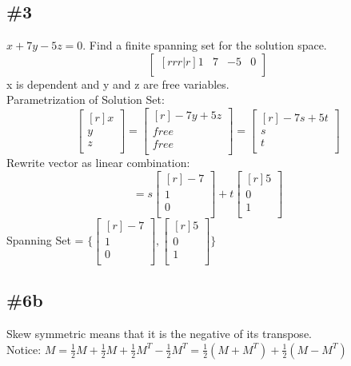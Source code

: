 \documentclass{report}
\begin{document}
\subsection{\#3}
$x+7y-5z=0$. Find a finite spanning set for the solution space.
\[ \begin{bmatrix}[rrr|r] 1&7&-5&0\\ \end{bmatrix} \]
x is dependent and y and z are free variables.\\
Parametrization of Solution Set:
\[ \begin{bmatrix}[r] x\\y\\z\\ \end{bmatrix} = \begin{bmatrix}[r] -7y+5z\\free\\free\\ \end{bmatrix} = \begin{bmatrix}[r] -7s+5t\\s\\t\\ \end{bmatrix} \]
Rewrite vector as linear combination:
\[ =s \begin{bmatrix}[r]-7\\1\\0\\ \end{bmatrix} +t \begin{bmatrix}[r] 5\\0\\1\\ \end{bmatrix} \]
Spanning Set = $\{\begin{bmatrix}[r]-7\\1\\0\\ \end{bmatrix} , \begin{bmatrix}[r]5\\0\\1\\ \end{bmatrix} \}$

\subsection{\#6b}
Skew symmetric means that it is the negative of its transpose.\\
Notice: $M=\frac{1}{2}M + \frac{1}{2}M + \frac{1}{2}M^T-\frac{1}{2}M^T = \frac{1}{2}(M+M^T)+\frac{1}{2}(M-M^T)$
\end{document}
